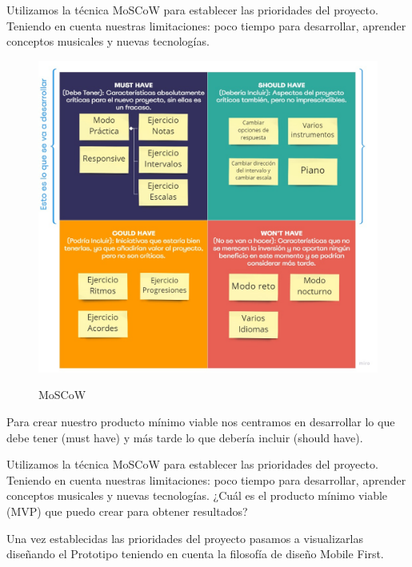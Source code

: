 \documentclass[12pt,twoside,titlepage]{report}
\begin{document}
Utilizamos la técnica MoSCoW para establecer las prioridades del proyecto. Teniendo en cuenta nuestras limitaciones: poco tiempo para desarrollar, aprender conceptos musicales y nuevas tecnologías. 

\begin{figure}[H]
    \centering
    \includegraphics[scale=0.35]{Design Thinking/MosCow}
    \label{fig:MoSCoW}
    \caption{MoSCoW}
\end{figure}

Para crear nuestro producto mínimo viable nos centramos en desarrollar lo que debe tener (must have) y más tarde lo que debería incluir (should have).

Utilizamos la técnica MoSCoW para establecer las prioridades del proyecto. Teniendo en cuenta nuestras limitaciones: poco tiempo para desarrollar, aprender conceptos musicales y nuevas tecnologías. ¿Cuál es el producto mínimo viable (MVP) que puedo crear para obtener resultados?

Una vez establecidas las prioridades del proyecto pasamos a visualizarlas diseñando el Prototipo teniendo en cuenta la filosofía de diseño Mobile First.
\end{document}
